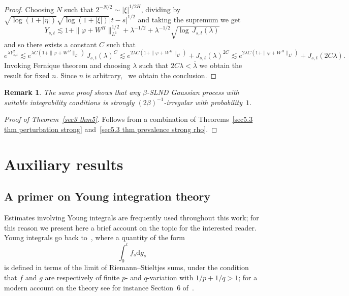\documentclass[10pt]{article}
\newcommand{\mathd}{\mathrm{d}}
\newtheorem{remark}[theorem]{Remark}
\begin{document}
\begin{proof}
  Choosing $N$ such that $2^{- N / 2} \sim | \xi |^{1 / 2 H}$, dividing by
  $\sqrt{\log (1 + | \eta |)}  \sqrt{\log (1 + | \xi |)} |t-s|^{1/2}$ and taking the
  supremum we get
  \[ Y_{s, t} \lesssim 1 + \| \varphi + W^H \|^{1 / 2}_{L^1} + \lambda^{- 1 /
     2} + \lambda^{- 1 / 2} \sqrt{\log \, J_{s, t} (\lambda)} \]
  and so there exists a constant $C$ such that
  \[ e^{\lambda Y_{s, t}^2} \lesssim e^{\lambda C (1 + \| \varphi + W^H
     \|_{L^1})} \, J_{s, t} (\lambda)^C \lesssim e^{2 \lambda C (1 + \|
     \varphi + W^H \|_{L^1})} + J_{s, t} (\lambda)^{2 C} \lesssim e^{2 \lambda
     C (1 + \| \varphi + W^H \|_{L^1})} + J_{s, t} (2 C \lambda) . \]
  Invoking Fernique theorem and choosing $\lambda$ such that $2 C \lambda <
  \overline{\lambda}$ we obtain the result for fixed $n$. Since $n$ is
  arbitrary, \ we obtain the conclusion.
\end{proof}

\begin{remark}
  The same proof shows that any $\beta$\mbox{-}SLND Gaussian process with
  suitable integrability conditions is strongly $(2 \beta)^{-
  1}$\mbox{-}irregular with probability~$1$.
\end{remark}

\begin{proof}[Proof of Theorem~\ref{sec3 thm5}]
  Follows from a combination of Theorems~\ref{sec5.3 thm perturbation strong}
  and~\ref{sec5.3 thm prevalence strong rho}.
\end{proof}

\appendix\section{Auxiliary results}\label{appendix}

\subsection{A primer on Young integration theory}\label{appendixA1}

Estimates involving Young integrals are frequently used throughout this work;
for this reason we present here a brief account on the topic for the
interested reader. Young integrals go back to~{\cite{young}}, where a quantity
of the form
\[ \int_0^t f_s \mathd g_s \]
is defined in terms of the limit of Riemann--Stieltjes sums, under the
condition that $f$ and $g$ are respectively of finite $p$\mbox{-} and
$q$\mbox{-}variation with $1 / p + 1 / q > 1$; for a modern account on the
theory see for instance Section~6 of~{\cite{frizvictoir}}.
\end{document}
